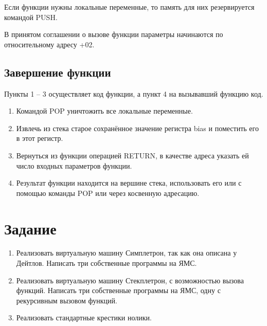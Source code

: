\documentclass[12pt]{article}
\begin{document}
Если функции нужны локальные переменные, то память для них резервируется командой PUSH.

В принятом соглашении о вызове функции параметры начинаются по относительному адресу +02.

\subsection{Завершение функции}
Пункты 1 -- 3 осуществляет код функции, а пункт 4 на вызывавший функцию код.
\begin{enumerate}
 \item Командой POP уничтожить все локальные переменные.
 \item Извлечь из стека старое сохранённое значение регистра bias и поместить его в этот регистр.
 \item Вернуться из функции операцией RETURN, в качестве адреса указать ей число входных параметров функции.
 \item Результат функции находится на вершине стека, использовать его или с помощью команды POP или через косвенную адресацию.
\end{enumerate}



\section{Задание}

\begin{enumerate}
 \item Реализовать виртуальную машину Симплетрон, так как она описана у Дейтлов. Написать три собственные программы  на
ЯМС.
 \item Реализовать виртуальную машину Стекплетрон, с возможностью вызова функций. Написать три собственные программы  на
ЯМС, одну с рекурсивным вызовом функций.
 \item Реализовать стандартные крестики нолики.
\end{enumerate}
\end{document}
